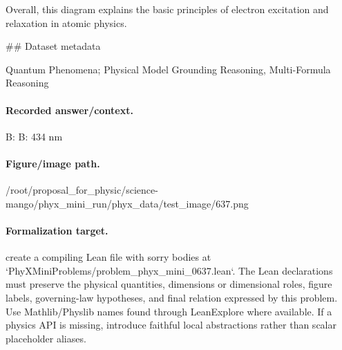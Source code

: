 Overall, this diagram explains the basic principles of electron excitation and relaxation in atomic physics.

\#\# Dataset metadata

Quantum Phenomena; Physical Model Grounding Reasoning, Multi-Formula Reasoning

\paragraph{Recorded answer/context.}
B: B: 434 nm

\paragraph{Figure/image path.}
/root/proposal\_for\_physic/science-mango/phyx\_mini\_run/phyx\_data/test\_image/637.png

\paragraph{Formalization target.}
create a compiling Lean file with sorry bodies at `PhyXMiniProblems/problem\_phyx\_mini\_0637.lean`. The Lean declarations must preserve the physical quantities, dimensions or dimensional roles, figure labels, governing-law hypotheses, and final relation expressed by this problem.
Use Mathlib/Physlib names found through LeanExplore where available. If a physics API is missing, introduce faithful local abstractions rather than scalar placeholder aliases.

